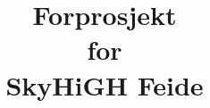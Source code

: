 \documentclass[12pt,a4paper]{article}
\begin{document}
\title{Forprosjekt \\ for \\ SkyHiGH Feide}

\newpage
\end{document}
